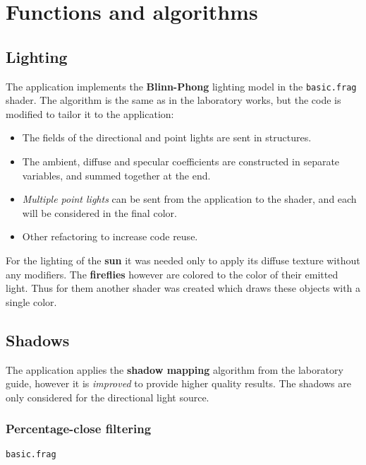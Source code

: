 \section{Functions and algorithms} 

\subsection{Lighting}

The application implements the \textbf{Blinn-Phong} lighting model in the \verb|basic.frag| shader. The algorithm is the same as in the laboratory works, but the code is modified to tailor it to the application:

\begin{itemize}
 \item The fields of the directional and point lights are sent in structures.
 \item The ambient, diffuse and specular coefficients are constructed in separate variables, and summed together at the end.
 \item \textit{Multiple point lights} can be sent from the application to the shader, and each will be considered in the final color.
 \item Other refactoring to increase code reuse.
\end{itemize}

For the lighting of the \textbf{sun} it was needed only to apply its diffuse texture without any modifiers. The \textbf{fireflies} however are colored to the color of their emitted light. Thus for them another shader was created which draws these objects with a single color.






\subsection{Shadows}

The application applies the \textbf{shadow mapping} algorithm from the laboratory guide, however it is \textit{improved} to provide higher quality results. The shadows are only considered for the directional light source.

\subsubsection{Percentage-close filtering}

\verb|basic.frag|

